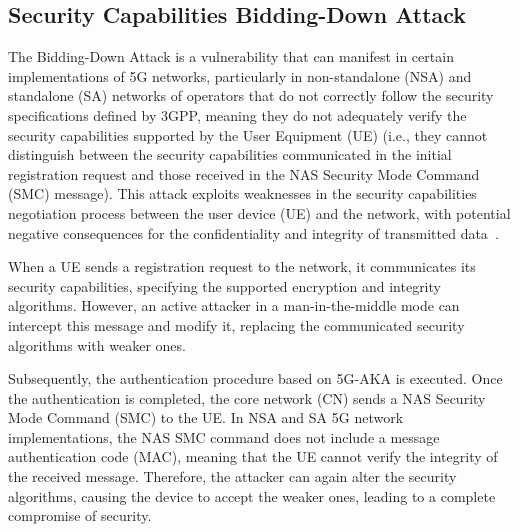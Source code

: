 \documentclass[english]{article}
\begin{document}

\subsection{Security Capabilities Bidding-Down Attack}
The Bidding-Down Attack is a vulnerability that can manifest in certain
implementations of 5G networks, particularly in non-standalone (NSA) and
standalone (SA) networks of operators that do not correctly follow the security
specifications defined by 3GPP, meaning they do not adequately verify the
security capabilities supported by the User Equipment (UE) (i.e., they cannot
distinguish between the security capabilities communicated in the initial
registration request and those received in the NAS Security Mode Command (SMC)
message). This attack exploits weaknesses in the security capabilities
negotiation process between the user device (UE) and the network, with
potential negative consequences for the confidentiality and integrity of
transmitted data~\cite{eleftherakis2024demystifying}.

When a UE sends a registration request to the network, it communicates its
security capabilities, specifying the supported encryption and integrity
algorithms. However, an active attacker in a man-in-the-middle mode can
intercept this message and modify it, replacing the communicated security
algorithms with weaker ones.

Subsequently, the authentication procedure based on 5G-AKA is executed. Once
the authentication is completed, the core network (CN) sends a NAS Security
Mode Command (SMC) to the UE. In NSA and SA 5G network implementations, the NAS
SMC command does not include a message authentication code (MAC), meaning that
the UE cannot verify the integrity of the received message. Therefore, the
attacker can again alter the security algorithms, causing the device to accept
the weaker ones, leading to a complete compromise of security.
\end{document}
